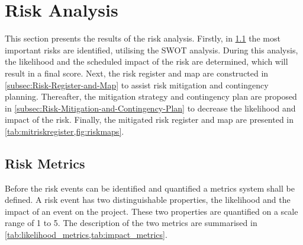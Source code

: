 \section{Risk Analysis}\label{sec:Risk-Analysis}
This section presents the results of the risk analysis.
Firstly, in \cref{subsec:Risk-Metrics} the most important risks are identified, utilising the SWOT analysis.
During this analysis, the likelihood and the scheduled impact of the risk are determined, which will result in a final score.
Next, the risk register and map are constructed in \cref{subsec:Risk-Register-and-Map} to assist risk mitigation and contingency planning.
Thereafter, the mitigation strategy and contingency plan are proposed in \cref{subsec:Risk-Mitigation-and-Contingency-Plan} to decrease the likelihood and impact of the risk.
Finally, the mitigated risk register and map are presented in \cref{tab:mitriskregister,fig:riskmaps}.

\subsection{Risk Metrics}\label{subsec:Risk-Metrics}
Before the risk events can be identified and quantified a metrics system shall be defined.
A risk event has two distinguishable properties, the likelihood and the impact of an event on the project.
These two properties are quantified on a scale range of 1 to 5.
The description of the two metrics are summarised in \cref{tab:likelihood_metrics,tab:impact_metrics}.

